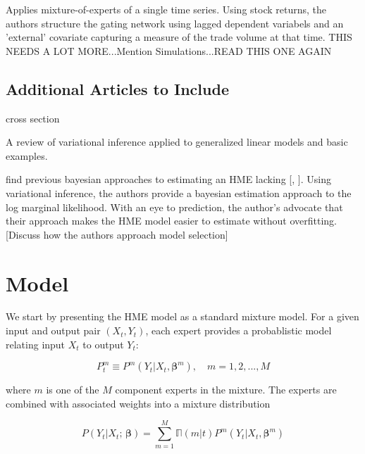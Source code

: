 \documentclass[12pt]{article}
\newcommand{\expmixwt}[0]{\mathbb{\Pi}}
\begin{document}
\cite{CarvalhoSkoulakis2010} Applies mixture-of-experts of a single time series.
Using stock returns, the authors structure the gating network using lagged
dependent variabels and an 'external' covariate capturing a measure of the
trade volume at that time. THIS NEEDS A LOT MORE...Mention Simulations...READ 
THIS ONE AGAIN




\subsection{Additional Articles to Include}


\cite{JeffriesPfeiffer2001} cross section

\cite{BleiKucukelbirMcAuliffe2006} A review of variational inference applied
to generalized linear models and basic examples.

\cite{UedaGhahramani2002}

\cite{BishopSvenson2003} find previous bayesian approaches to estimating an HME
lacking [\cite{HuertaJiangTanner2003}, \cite{UedaGhahramani2002}]. Using
variational inference, the authors provide a bayesian estimation approach
to the log marginal likelihood. With an eye to prediction, the author's advocate
that their approach makes the HME model easier to estimate without overfitting.
[Discuss how the authors approach model selection]


\cite{CarvalhoSkoulakis2005}

\bigskip


\section{Model} \label{sec:Model}

We start by presenting the HME model as a standard mixture model.
For a given input and output pair $(X_{t}, Y_{t})$, each expert
provides a probablistic model relating input $X_{t}$ to output
$Y_{t}$:

\begin{equation} \label{eq:ConditionalDistribution}
  P^{m}_{t} \equiv P^{m}(Y_{t}|X_{t}, \boldsymbol{\beta}^{m}), \quad m = 1,2,...,M
\end{equation}

where $m$ is one of the $M$ component experts in the mixture. The experts
are combined with associated weights into a mixture distribution

\begin{equation} \label{eq:staticmixture}
  P(Y_{t} | X_{t}; \, \boldsymbol{\beta}) = \sum_{m=1}^{M} \expmixwt(m|t) P^{m}(Y_{t} | X_{t}, \boldsymbol{\beta}^{m})
\end{equation}
\end{document}
